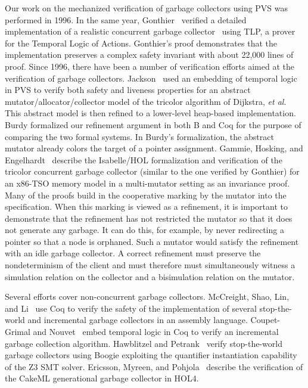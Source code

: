 
Our work on the mechanized verification of garbage collectors using PVS was performed in
1996.  In the same year, 
Gonthier~\cite{gonthier1996verifying}
verified a detailed 
implementation of a realistic concurrent garbage collector~\cite{doligez1994portable} using TLP, a prover
for the Temporal Logic of Actions.  Gonthier's proof demonstrates 
that the implementation preserves a complex safety invariant 
with about 22,000 lines of proof.  Since 1996, there have been a
number of
verification efforts aimed at the verification of garbage collectors.
Jackson~\cite{jackson1998verifying} used an embedding of temporal logic in PVS to verify both
safety and liveness properties for an abstract
mutator/allocator/collector model of the tricolor algorithm of
Dijkstra, \emph{et al}.  This abstract model is then
refined to a lower-level heap-based implementation.  Burdy formalized
our refinement argument in both B and Coq for the purpose of comparing
the
two formal systems.  In Burdy's formalization, the abstract mutator
already colors the target of a pointer assignment.
Gammie, Hosking,
and Engelhardt~\cite{gammie2015relaxing} describe the Isabelle/HOL
formalization and verification of
the tricolor concurrent garbage 
collector (similar to the one verified by Gonthier) for an x86-TSO
memory model in a multi-mutator setting as an invariance proof.
Many of the proofs build in the cooperative marking by the mutator
into the specification.  When this marking is viewed as a refinement,
it
is important to demonstrate that the refinement has not restricted the
mutator so that it does not generate any garbage.  It can do this, for
example,
by never redirecting a pointer so that a node is orphaned.  Such a
mutator
would satisfy the refinement with an idle garbage collector.  A
correct
refinement must preserve the nondeterminism of the client and must
therefore must simultaneously witness a simulation relation on the
collector and a bisimulation
relation on the mutator.  

Several efforts cover non-concurrent garbage collectors.  McCreight,
Shao, Lin, and Li~\cite{mccreight2007general} use Coq to
verify the safety of the implementation of several
stop-the-world and incremental garbage collectors in an assembly
language.  Coupet-Grimal and Nouvet~\cite{8133460} embed temporal
logic in Coq to verify an incremental garbage collection algorithm.
Hawblitzel and Petrank~\cite{hawblitzel2009automated} verify stop-the-world garbage collectors using
Boogie exploiting the quantifier instantiation capability of the Z3
SMT solver. Ericsson, Myreen, and Pohjola~\cite{ericsson2017verified}
describe the verification of
the CakeML generational garbage collector in HOL4.
